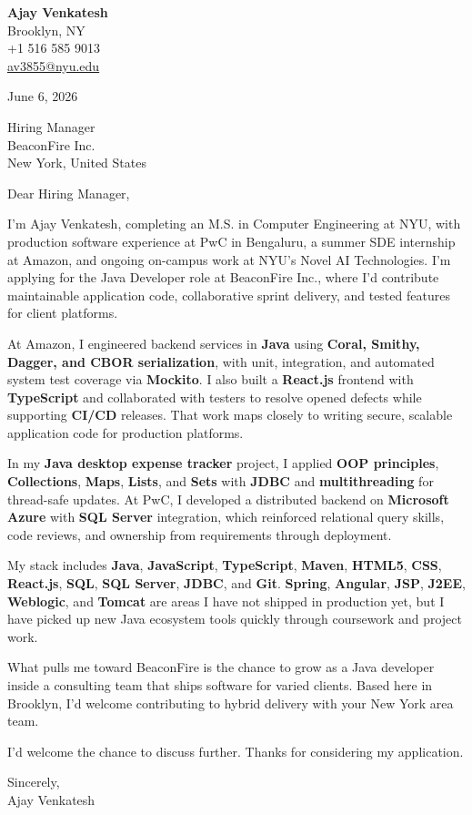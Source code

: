 \documentclass[letterpaper,11pt]{article}
\begin{document}
\begin{flushleft}
\textbf{\large Ajay Venkatesh} \\
Brooklyn, NY \\
+1 516 585 9013 \\
\href{mailto:av3855@nyu.edu}{av3855@nyu.edu}
\end{flushleft}
\vspace{10pt}
June 6, 2026
\vspace{6pt}

Hiring Manager \\
BeaconFire Inc. \\
New York, United States

\vspace{10pt}

Dear Hiring Manager,

I'm Ajay Venkatesh, completing an M.S. in Computer Engineering at NYU, with production software experience at PwC in Bengaluru, a summer SDE internship at Amazon, and ongoing on-campus work at NYU's Novel AI Technologies. I'm applying for the Java Developer role at BeaconFire Inc., where I'd contribute maintainable application code, collaborative sprint delivery, and tested features for client platforms.

At Amazon, I engineered backend services in \textbf{Java} using \textbf{Coral, Smithy, Dagger, and CBOR serialization}, with unit, integration, and automated system test coverage via \textbf{Mockito}. I also built a \textbf{React.js} frontend with \textbf{TypeScript} and collaborated with testers to resolve opened defects while supporting \textbf{CI/CD} releases. That work maps closely to writing secure, scalable application code for production platforms.

In my \textbf{Java desktop expense tracker} project, I applied \textbf{OOP principles}, \textbf{Collections}, \textbf{Maps}, \textbf{Lists}, and \textbf{Sets} with \textbf{JDBC} and \textbf{multithreading} for thread-safe updates. At PwC, I developed a distributed backend on \textbf{Microsoft Azure} with \textbf{SQL Server} integration, which reinforced relational query skills, code reviews, and ownership from requirements through deployment.

My stack includes \textbf{Java}, \textbf{JavaScript}, \textbf{TypeScript}, \textbf{Maven}, \textbf{HTML5}, \textbf{CSS}, \textbf{React.js}, \textbf{SQL}, \textbf{SQL Server}, \textbf{JDBC}, and \textbf{Git}. \textbf{Spring}, \textbf{Angular}, \textbf{JSP}, \textbf{J2EE}, \textbf{Weblogic}, and \textbf{Tomcat} are areas I have not shipped in production yet, but I have picked up new Java ecosystem tools quickly through coursework and project work.

What pulls me toward BeaconFire is the chance to grow as a Java developer inside a consulting team that ships software for varied clients. Based here in Brooklyn, I'd welcome contributing to hybrid delivery with your New York area team.

I'd welcome the chance to discuss further. Thanks for considering my application.

\vspace{12pt}
Sincerely, \\
Ajay Venkatesh
\end{document}
